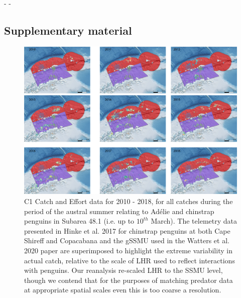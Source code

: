 \documentclass[]{elsarticle} %
\begin{document}
\newpage
\setcounter{table}{0}  \renewcommand{\thetable}{S\arabic{table}}     -   - \setcounter{figure}{0} \renewcommand{\thefigure}{S\arabic{figure}}
\begin{landscape}

\section{Supplementary material}\label{supplementary-material}

\begin{figure}
 \includegraphics[width=0.8\linewidth]{./Watters EMM figures/summer catch/Year by year catch} \caption{C1 Catch and Effort data for 2010 - 2018, for all catches during the period of the austral summer relating to Adélie and chinstrap penguins in Subarea 48.1 (i.e. up to $10^{th}$ March).  The telemetry data presented in Hinke et al. 2017 for chinstrap penguins at both Cape Shireff and Copacabana and the gSSMU used in the Watters et al. 2020 paper are superimposed to highlight the extreme variability in actual catch, relative to the scale of LHR used to reflect interactions with penguins.  Our reanalysis re-scaled LHR to the SSMU level, though we contend that for the purposes of matching predator data at appropriate spatial scales even this is too coarse a resolution.}\label{fig:Supplementary Figure 1}
 \end{figure}
\end{landscape}
\end{document}
